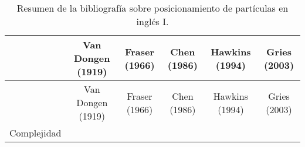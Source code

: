 \documentclass[authoryear,a4paper, 14pt]{scrartcl}
\begin{document}
\begin{longtable}[]{@{}lccccc@{}}
\caption{\protect\hypertarget{cuadro1}{}{Resumen} de la bibliografía
sobre posicionamiento de partículas en inglés I.}\tabularnewline
\toprule
\begin{minipage}[b]{0.18\columnwidth}\raggedright
\strut
\end{minipage} & \begin{minipage}[b]{0.15\columnwidth}\centering
Van Dongen (1919)\strut
\end{minipage} & \begin{minipage}[b]{0.13\columnwidth}\centering
Fraser (1966)\strut
\end{minipage} & \begin{minipage}[b]{0.13\columnwidth}\centering
Chen (1986)\strut
\end{minipage} & \begin{minipage}[b]{0.13\columnwidth}\centering
Hawkins (1994)\strut
\end{minipage} & \begin{minipage}[b]{0.13\columnwidth}\centering
Gries (2003)\strut
\end{minipage}\tabularnewline
\midrule
\endfirsthead
\toprule
\begin{minipage}[b]{0.18\columnwidth}\raggedright
\strut
\end{minipage} & \begin{minipage}[b]{0.15\columnwidth}\centering
Van Dongen (1919)\strut
\end{minipage} & \begin{minipage}[b]{0.13\columnwidth}\centering
Fraser (1966)\strut
\end{minipage} & \begin{minipage}[b]{0.13\columnwidth}\centering
Chen (1986)\strut
\end{minipage} & \begin{minipage}[b]{0.13\columnwidth}\centering
Hawkins (1994)\strut
\end{minipage} & \begin{minipage}[b]{0.13\columnwidth}\centering
Gries (2003)\strut
\end{minipage}\tabularnewline
\midrule
\endhead
\begin{minipage}[t]{0.18\columnwidth}\raggedright
Complejidad\strut
\end{minipage} & \begin{minipage}[t]{0.15\columnwidth}\centering
\strut
\end{minipage} & \begin{minipage}[t]{0.13\columnwidth}\centering

\end{minipage}
\end{longtable}
\end{document}
